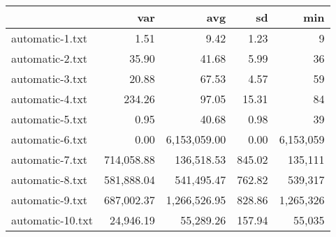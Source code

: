 \begin{tabular}{lrrrr}
  \toprule  & var & avg & sd & min \\ 
  \midrule automatic-1.txt & 1.51 & 9.42 & 1.23 & 9 \\ 
  automatic-2.txt & 35.90 & 41.68 & 5.99 & 36 \\ 
  automatic-3.txt & 20.88 & 67.53 & 4.57 & 59 \\ 
  automatic-4.txt & 234.26 & 97.05 & 15.31 & 84 \\ 
  automatic-5.txt & 0.95 & 40.68 & 0.98 & 39 \\ 
  automatic-6.txt & 0.00 & 6,153,059.00 & 0.00 & 6,153,059 \\ 
  automatic-7.txt & 714,058.88 & 136,518.53 & 845.02 & 135,111 \\ 
  automatic-8.txt & 581,888.04 & 541,495.47 & 762.82 & 539,317 \\ 
  automatic-9.txt & 687,002.37 & 1,266,526.95 & 828.86 & 1,265,326 \\ 
  automatic-10.txt & 24,946.19 & 55,289.26 & 157.94 & 55,035 \\ 
   \bottomrule \end{tabular}
